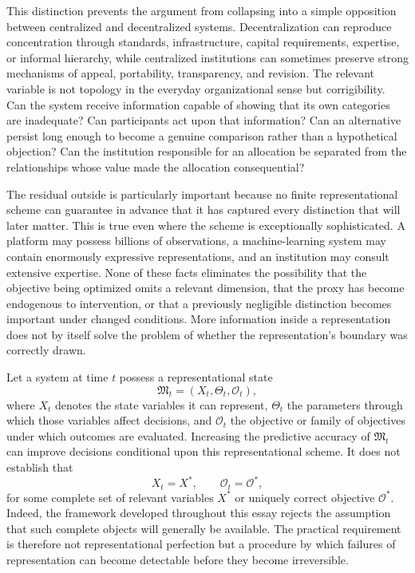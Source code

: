 \documentclass[11pt]{article}
\begin{document}
This distinction prevents the argument from collapsing into a simple opposition between centralized and decentralized systems. Decentralization can reproduce concentration through standards, infrastructure, capital requirements, expertise, or informal hierarchy, while centralized institutions can sometimes preserve strong mechanisms of appeal, portability, transparency, and revision. The relevant variable is not topology in the everyday organizational sense but corrigibility. Can the system receive information capable of showing that its own categories are inadequate? Can participants act upon that information? Can an alternative persist long enough to become a genuine comparison rather than a hypothetical objection? Can the institution responsible for an allocation be separated from the relationships whose value made the allocation consequential?

The residual outside is particularly important because no finite representational scheme can guarantee in advance that it has captured every distinction that will later matter. This is true even where the scheme is exceptionally sophisticated. A platform may possess billions of observations, a machine-learning system may contain enormously expressive representations, and an institution may consult extensive expertise. None of these facts eliminates the possibility that the objective being optimized omits a relevant dimension, that the proxy has become endogenous to intervention, or that a previously negligible distinction becomes important under changed conditions. More information inside a representation does not by itself solve the problem of whether the representation's boundary was correctly drawn.

Let a system at time \(t\) possess a representational state
\[
\mathfrak{M}_t = (X_t,\Theta_t,\mathcal{O}_t),
\]
where \(X_t\) denotes the state variables it can represent, \(\Theta_t\) the parameters through which those variables affect decisions, and \(\mathcal{O}_t\) the objective or family of objectives under which outcomes are evaluated. Increasing the predictive accuracy of \(\mathfrak{M}_t\) can improve decisions conditional upon this representational scheme. It does not establish that
\[
X_t = X^{*},
\qquad
\mathcal{O}_t = \mathcal{O}^{*},
\]
for some complete set of relevant variables \(X^{*}\) or uniquely correct objective \(\mathcal{O}^{*}\). Indeed, the framework developed throughout this essay rejects the assumption that such complete objects will generally be available. The practical requirement is therefore not representational perfection but a procedure by which failures of representation can become detectable before they become irreversible.
\end{document}
